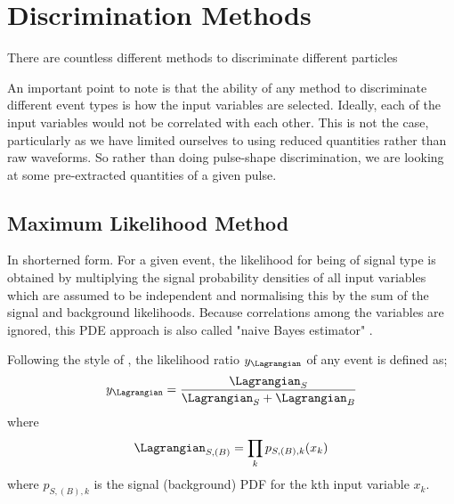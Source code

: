 \section{Discrimination Methods}

\par
There are countless different methods to discriminate different particles


\par
An important point to note is that the ability of any method to discriminate different event types is how the input variables are selected.
Ideally, each of the input variables would not be correlated with each other.
This is not the case, particularly as we have limited ourselves to using reduced quantities rather than raw waveforms.
So rather than doing pulse-shape discrimination, we are looking at some pre-extracted quantities of a given pulse.

\subsection{Maximum Likelihood Method}
\par
In shorterned form. 
For a given event, the likelihood for being of signal type is obtained by multiplying the signal probability densities of all input variables which are assumed to be independent and normalising this by the sum of the signal and background likelihoods.
Because correlations among the variables are ignored, this PDE approach is also called "naive Bayes estimator" \cite{TMVA_ref}.

Following the style of \cite{TMVA_ref}, the likelihood ratio $y_{\Lagrangian}$ of any event is defined as;
\begin{equation}
    y_{\Lagrangian} = \frac{\Lagrangian_{S}}{\Lagrangian_{S} + \Lagrangian_{B}}
\end{equation}
where
\begin{equation}
    \Lagrangian_{S,(B)} = \prod_k p_{S,(B),k}(x_k)
\end{equation}
where $p_{S,(B),k}$ is the signal (background) PDF for the kth input variable $x_k$.